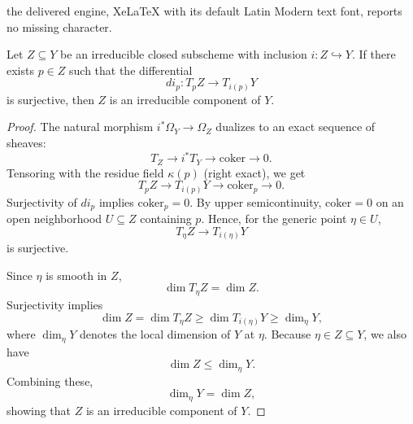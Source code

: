 \documentclass[10pt,a4paper]{amsart}
\begin{document}
the delivered engine, XeLaTeX with its default Latin Modern text font, reports no missing character.
\begin{proposition}
Let \( Z \subseteq Y \) be an irreducible closed subscheme with inclusion \( i: Z \hookrightarrow Y \). If there exists \( p \in Z \) such that the differential 
\[
di_p : T_p Z \to T_{i(p)} Y
\]
is surjective, then \( Z \) is an irreducible component of \( Y \).
\label{prop:irreducible_component}
\end{proposition}

\begin{proof}
The natural morphism \( i^* \Omega_Y \to \Omega_Z \) dualizes to an exact sequence of sheaves:
\[
T_Z \to i^* T_Y \to \mathrm{coker} \to 0.
\]
Tensoring with the residue field \(\kappa(p)\) (right exact), we get
\[
T_p Z \to T_{i(p)} Y \to \mathrm{coker}_p \to 0.
\]
Surjectivity of \( di_p \) implies \(\mathrm{coker}_p = 0\). By upper semicontinuity, \( \mathrm{coker} = 0 \) on an open neighborhood \( U \subseteq Z \) containing \( p \). Hence, for the generic point \(\eta \in U\), 
\[
T_\eta Z \to T_{i(\eta)} Y
\]
is surjective.

Since \(\eta\) is smooth in \(Z\),
\[
\dim T_\eta Z = \dim Z.
\]
Surjectivity implies
\[
\dim Z = \dim T_\eta Z \geq \dim T_{i(\eta)} Y \geq \dim_\eta Y,
\]
where \(\dim_\eta Y\) denotes the local dimension of \(Y\) at \(\eta\). Because \(\eta \in Z \subseteq Y\), we also have
\[
\dim Z \leq \dim_\eta Y.
\]
Combining these,
\[
\dim_\eta Y = \dim Z,
\]
showing that \( Z \) is an irreducible component of \( Y \).
\end{proof}
\end{document}
